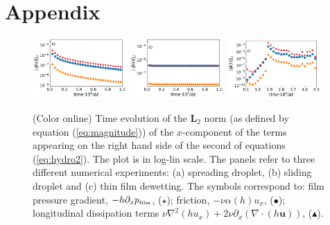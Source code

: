 \section{Appendix}
\label{app:only}
\begin{figure}
    \centering
    \includegraphics[width=0.32\textwidth]{graphics/Fig_9_1_Relax_drop_term_analysis_second_revision_without_advec_new.png}
    \includegraphics[width=0.32\textwidth]{graphics/Fig_9_2_moving_drop_term_analysis_smaller_drop_theta_5_better.png}
    \includegraphics[width=0.32\textwidth]{graphics/Fig_9_3_dewetting_term_analysis_no_legend_new_without_advec.png}
    \caption{(Color online) Time evolution of the 
  $\mathbf{L}_2$ norm (as defined by equation 
  (\ref{eq:magnitude})) of the $x$-component of the terms appearing on the right hand side of the second of equations (\ref{eq:hydro2}). The plot is in log-lin scale.
  The panels refer to three different numerical experiments: (a) spreading droplet, (b) sliding droplet and (c) thin film dewetting. The symbols correspond to: 
  film pressure gradient, $-h\partial_x p_{\mbox{\tiny{film}}}$, (\textcolor{pyred}{$\star$}); friction, $-\nu \alpha(h) u_x$, (\textcolor{pyblue}{$\bullet$}); longitudinal dissipation terms 
  $\nu \nabla^2 (h u_x) + 2\nu \partial_x (\nabla \cdot (h\mathbf{u}))$, (\textcolor{pyorange}{$\blacktriangle$}).}
  \label{fig:Referee_1}
\end{figure}

